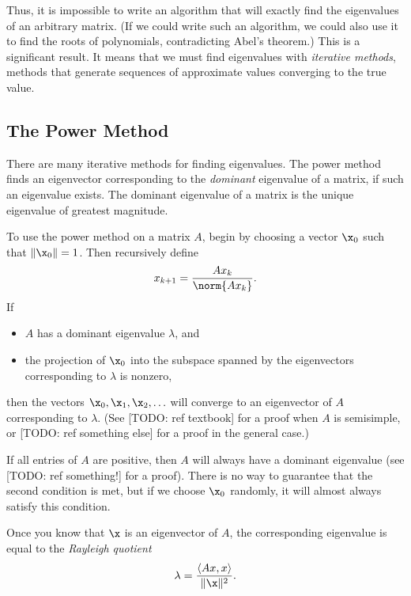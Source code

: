 Thus, it is impossible to write an algorithm that will exactly find the eigenvalues of an arbitrary matrix.
(If we could write such an algorithm, we could also use it to find the roots of polynomials, contradicting Abel's theorem.)
This is a significant result.
It means that we must find eigenvalues with \emph{iterative methods}, methods that generate sequences of approximate values converging to the true value.

\subsection*{The Power Method} %

There are many iterative methods for finding eigenvalues.
The power method finds an eigenvector corresponding to the \emph{dominant} eigenvalue of a matrix, if such an eigenvalue exists.
The dominant eigenvalue of a matrix is the unique eigenvalue of greatest magnitude.

To use the power method on a matrix $A$, begin by choosing a vector $\x_0$ such that $\|\x_0\|=1$. Then recursively define
\[
x_{k+1}=\frac{Ax_k}{\norm{Ax_k}}.
\]
If
\begin{itemize}
\item $A$ has a dominant eigenvalue $\lambda$, and
\item the projection of $\x_0$ into the subspace spanned by the eigenvectors corresponding to $\lambda$ is nonzero,
\end{itemize}
then the vectors $\x_0, \x_1, \x_2, \ldots$ will converge to an eigenvector of $A$ corresponding to $\lambda$.
(See [TODO: ref textbook] for a proof when $A$ is semisimple, or [TODO: ref something else] for a proof in the general case.)

If all entries of $A$ are positive, then $A$ will always have a dominant eigenvalue (see [TODO: ref something!] for a proof).
There is no way to guarantee that the second condition is met, but if we choose $\x_0$ randomly, it will almost always satisfy this condition.

Once you know that $\x$ is an eigenvector of $A$, the corresponding eigenvalue is equal to the \emph{Rayleigh quotient}
\[
\lambda = \frac{\langle Ax, x \rangle}{\|\x\|^2}.
\]

